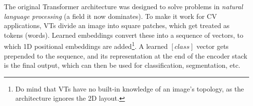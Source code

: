 The original Transformer architecture was designed to solve problems in \textit{natural language processing} (a field it now dominates). To make it work for CV applications, VTs divide an image into square patches, which get treated as tokens (words). Learned embeddings convert these into a sequence of vectors, to which 1D positional embeddings are added\footnote{Do mind that VTs have no built-in knowledge of an image's topology, as the architecture ignores the 2D layout.}. A learned $[class]$ vector gets prepended to the sequence, and its representation at the end of the encoder stack is the final output, which can then be used for classification, segmentation, etc.






